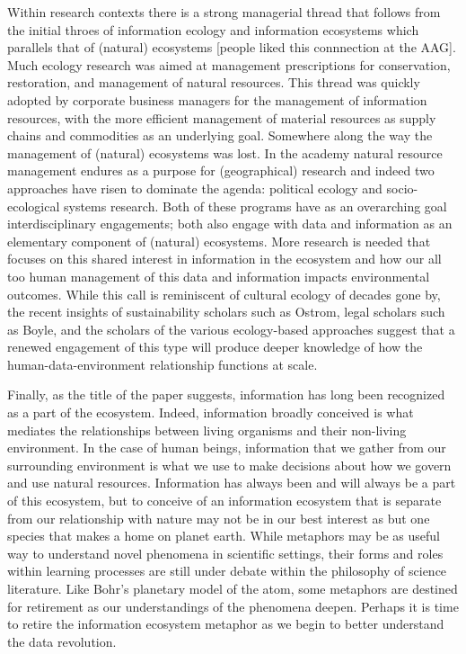 Within research contexts there is a strong managerial thread that follows from the initial throes of information ecology and information ecosystems which parallels that of (natural) ecosystems [people liked this connnection at the AAG]. Much ecology research was aimed at management prescriptions for conservation, restoration, and management of natural resources. This thread was quickly adopted by corporate business managers for the management of information resources, with the more efficient management of material resources as supply chains and commodities as an underlying goal. Somewhere along the way the management of (natural) ecosystems was lost. In the academy natural resource management endures as a purpose for (geographical) research and indeed two approaches have risen to dominate the agenda: political ecology and socio-ecological systems research. Both of these programs have as an overarching goal interdisciplinary engagements; both also engage with data and information as an elementary component of (natural) ecosystems. More research is needed that focuses on this shared interest in information in the ecosystem and how our all too human management of this data and information impacts environmental outcomes. While this call is reminiscent of cultural ecology of decades gone by, the recent insights of sustainability scholars such as Ostrom, legal scholars such as Boyle, and the scholars of the various ecology-based approaches suggest that a renewed engagement of this type will produce deeper knowledge of how the human-data-environment relationship functions at scale.

Finally, as the title of the paper suggests, information has long been recognized as a part of the ecosystem. Indeed, information broadly conceived is what mediates the relationships between living organisms and their non-living environment. In the case of human beings, information that we gather from our surrounding environment is what we use to make decisions about how we govern and use natural resources. Information has always been and will always be a part of this ecosystem, but to conceive of an information ecosystem that is separate from our relationship with nature may not be in our best interest as but one species that makes a home on planet earth. While metaphors may be as useful way to understand novel phenomena in scientific settings, their forms and roles within learning processes are still under debate within the philosophy of science literature. Like Bohr's planetary model of the atom, some metaphors are destined for retirement as our understandings of the phenomena deepen. Perhaps it is time to retire the information ecosystem metaphor as we begin to better understand the data revolution.